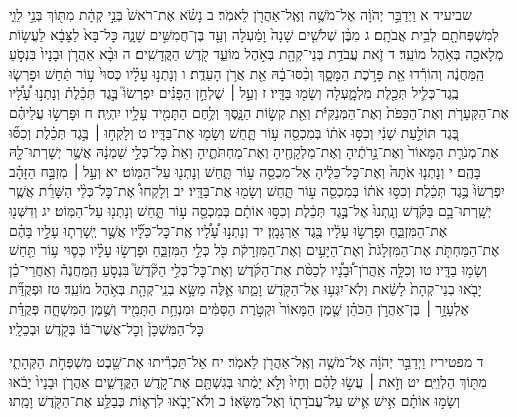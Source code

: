 \documentclass[twoside, openany, parskip=half, 11pt]{book}
\begin{document}
שביעיד א וַיְדַבֵּ֣ר יְהֹוָ֔ה אֶל־מֹשֶׁ֥ה וְאֶֽל־אַהֲרֹ֖ן לֵאמֹֽר׃ ב נָשֹׂ֗א אֶת־רֹאשׁ֙ בְּנֵ֣י קְהָ֔ת מִתּ֖וֹךְ בְּנֵ֣י לֵוִ֑י לְמִשְׁפְּחֹתָ֖ם לְבֵ֥ית אֲבֹתָֽם׃ ג מִבֶּ֨ן שְׁלֹשִׁ֤ים שָׁנָה֙ וָמַ֔עְלָה וְעַ֖ד בֶּן־חֲמִשִּׁ֣ים שָׁנָ֑ה כׇּל־בָּא֙ לַצָּבָ֔א לַעֲשׂ֥וֹת מְלָאכָ֖ה בְּאֹ֥הֶל מוֹעֵֽד׃ ד זֹ֛את עֲבֹדַ֥ת בְּנֵי־קְהָ֖ת בְּאֹ֣הֶל מוֹעֵ֑ד קֹ֖דֶשׁ הַקֳּדָשִֽׁים׃ ה וּבָ֨א אַהֲרֹ֤ן וּבָנָיו֙ בִּנְסֹ֣עַ הַֽמַּחֲנֶ֔ה וְהוֹרִ֕דוּ אֵ֖ת פָּרֹ֣כֶת הַמָּסָ֑ךְ וְכִ֨סּוּ־בָ֔הּ אֵ֖ת אֲרֹ֥ן הָעֵדֻֽת׃ ו וְנָתְנ֣וּ עָלָ֗יו כְּסוּי֙ ע֣וֹר תַּ֔חַשׁ וּפָרְשׂ֧וּ בֶֽגֶד־כְּלִ֛יל תְּכֵ֖לֶת מִלְמָ֑עְלָה וְשָׂמ֖וּ בַּדָּֽיו׃ ז וְעַ֣ל ׀ שֻׁלְחַ֣ן הַפָּנִ֗ים יִפְרְשׂוּ֮ בֶּ֣גֶד תְּכֵ֒לֶת֒ וְנָתְנ֣וּ עָ֠לָ֠יו אֶת־הַקְּעָרֹ֤ת וְאֶת־הַכַּפֹּת֙ וְאֶת־הַמְּנַקִּיֹּ֔ת וְאֵ֖ת קְשׂ֣וֹת הַנָּ֑סֶךְ וְלֶ֥חֶם הַתָּמִ֖יד עָלָ֥יו יִהְיֶֽה׃ ח וּפָרְשׂ֣וּ עֲלֵיהֶ֗ם בֶּ֚גֶד תּוֹלַ֣עַת שָׁנִ֔י וְכִסּ֣וּ אֹת֔וֹ בְּמִכְסֵ֖ה ע֣וֹר תָּ֑חַשׁ וְשָׂמ֖וּ אֶת־בַּדָּֽיו׃ ט וְלָקְח֣וּ ׀ בֶּ֣גֶד תְּכֵ֗לֶת וְכִסּ֞וּ אֶת־מְנֹרַ֤ת הַמָּאוֹר֙ וְאֶת־נֵ֣רֹתֶ֔יהָ וְאֶת־מַלְקָחֶ֖יהָ וְאֶת־מַחְתֹּתֶ֑יהָ וְאֵת֙ כׇּל־כְּלֵ֣י שַׁמְנָ֔הּ אֲשֶׁ֥ר יְשָׁרְתוּ־לָ֖הּ בָּהֶֽם׃ י וְנָתְנ֤וּ אֹתָהּ֙ וְאֶת־כׇּל־כֵּלֶ֔יהָ אֶל־מִכְסֵ֖ה ע֣וֹר תָּ֑חַשׁ וְנָתְנ֖וּ עַל־הַמּֽוֹט׃ יא וְעַ֣ל ׀ מִזְבַּ֣ח הַזָּהָ֗ב יִפְרְשׂוּ֙ בֶּ֣גֶד תְּכֵ֔לֶת וְכִסּ֣וּ אֹת֔וֹ בְּמִכְסֵ֖ה ע֣וֹר תָּ֑חַשׁ וְשָׂמ֖וּ אֶת־בַּדָּֽיו׃ יב וְלָקְחוּ֩ אֶת־כׇּל־כְּלֵ֨י הַשָּׁרֵ֜ת אֲשֶׁ֧ר יְשָֽׁרְתוּ־בָ֣ם בַּקֹּ֗דֶשׁ וְנָֽתְנוּ֙ אֶל־בֶּ֣גֶד תְּכֵ֔לֶת וְכִסּ֣וּ אוֹתָ֔ם בְּמִכְסֵ֖ה ע֣וֹר תָּ֑חַשׁ וְנָתְנ֖וּ עַל־הַמּֽוֹט׃ יג וְדִשְּׁנ֖וּ אֶת־הַמִּזְבֵּ֑חַ וּפָרְשׂ֣וּ עָלָ֔יו בֶּ֖גֶד אַרְגָּמָֽן׃ יד וְנָתְנ֣וּ עָ֠לָ֠יו אֶֽת־כׇּל־כֵּלָ֞יו אֲשֶׁ֣ר יְֽשָׁרְת֧וּ עָלָ֣יו בָּהֶ֗ם אֶת־הַמַּחְתֹּ֤ת אֶת־הַמִּזְלָגֹת֙ וְאֶת־הַיָּעִ֣ים וְאֶת־הַמִּזְרָקֹ֔ת כֹּ֖ל כְּלֵ֣י הַמִּזְבֵּ֑חַ וּפָרְשׂ֣וּ עָלָ֗יו כְּס֛וּי ע֥וֹר תַּ֖חַשׁ וְשָׂמ֥וּ בַדָּֽיו׃ טו וְכִלָּ֣ה אַֽהֲרֹן־וּ֠בָנָ֠יו לְכַסֹּ֨ת אֶת־הַקֹּ֜דֶשׁ וְאֶת־כׇּל־כְּלֵ֣י הַקֹּ֘דֶשׁ֮ בִּנְסֹ֣עַ הַֽמַּחֲנֶה֒ וְאַחֲרֵי־כֵ֗ן יָבֹ֤אוּ בְנֵי־קְהָת֙ לָשֵׂ֔את וְלֹֽא־יִגְּע֥וּ אֶל־הַקֹּ֖דֶשׁ וָמֵ֑תוּ אֵ֛לֶּה מַשָּׂ֥א בְנֵֽי־קְהָ֖ת בְּאֹ֥הֶל מוֹעֵֽד׃ טז וּפְקֻדַּ֞ת אֶלְעָזָ֣ר ׀ בֶּן־אַהֲרֹ֣ן הַכֹּהֵ֗ן שֶׁ֤מֶן הַמָּאוֹר֙ וּקְטֹ֣רֶת הַסַּמִּ֔ים וּמִנְחַ֥ת הַתָּמִ֖יד וְשֶׁ֣מֶן הַמִּשְׁחָ֑ה פְּקֻדַּ֗ת כׇּל־הַמִּשְׁכָּן֙ וְכׇל־אֲשֶׁר־בּ֔וֹ בְּקֹ֖דֶשׁ וּבְכֵלָֽיו׃

ד מפטיריז וַיְדַבֵּ֣ר יְהֹוָ֔ה אֶל־מֹשֶׁ֥ה וְאֶֽל־אַהֲרֹ֖ן לֵאמֹֽר׃ יח אַל־תַּכְרִ֕יתוּ אֶת־שֵׁ֖בֶט מִשְׁפְּחֹ֣ת הַקְּהָתִ֑י מִתּ֖וֹךְ הַלְוִיִּֽם׃ יט וְזֹ֣את ׀ עֲשׂ֣וּ לָהֶ֗ם וְחָיוּ֙ וְלֹ֣א יָמֻ֔תוּ בְּגִשְׁתָּ֖ם אֶת־קֹ֣דֶשׁ הַקֳּדָשִׁ֑ים אַהֲרֹ֤ן וּבָנָיו֙ יָבֹ֔אוּ וְשָׂמ֣וּ אוֹתָ֗ם אִ֥ישׁ אִ֛ישׁ עַל־עֲבֹדָת֖וֹ וְאֶל־מַשָּׂאֽוֹ׃ כ וְלֹא־יָבֹ֧אוּ לִרְא֛וֹת כְּבַלַּ֥ע אֶת־הַקֹּ֖דֶשׁ וָמֵֽתוּ׃
\end{document}
